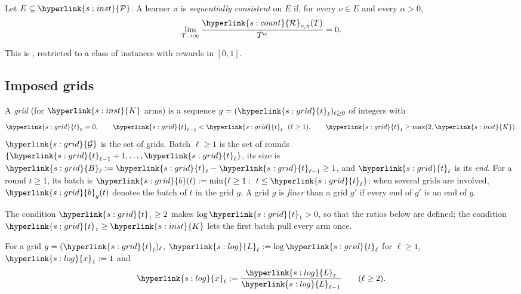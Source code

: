 \documentclass[11pt]{article}
\newcommand{\dt}[1]{\hypertarget{#1}{}}
\newcommand{\sy}[2]{{\hyperlink{#1}{#2}}}
\newcommand{\1}{\mathbf{1}}
\newcommand{\Kar}{\sy{s:inst}{K}}
\newcommand{\cP}{\sy{s:inst}{\mathcal P}}
\newcommand{\Reg}{\sy{s:count}{\mathcal R}}
\newcommand{\Gr}{\sy{s:grid}{\mathcal G}}
\newcommand{\tl}{\sy{s:grid}{t}}
\newcommand{\Bg}{\sy{s:grid}{B}}
\newcommand{\bt}{\sy{s:grid}{b}}
\newcommand{\Lg}{\sy{s:log}{L}}
\newcommand{\xg}{\sy{s:log}{x}}
\begin{document}
\begin{definition}\label{def:seqcons}
\dt{t:seqc}Let $E\subseteq\cP$. A learner $\pi$ is \emph{sequentially consistent} on $E$ if, for
every $\nu\in E$ and every $\alpha>0$,
\begin{equation*}
  \lim_{T\to\infty}\frac{\Reg_{\nu,\pi}(T)}{T^{\alpha}}=0 .
\end{equation*}
\end{definition}

This is \citet[Definition~16.1]{LS}, restricted to a class of instances with rewards in $[0,1]$.

\subsection{Imposed grids}

\begin{definition}\label{def:grid}
\dt{s:grid}A \emph{grid} (for $\Kar$ arms) is a sequence $g=(\tl_\ell)_{\ell\ge0}$ of integers with
\begin{equation*}
  \tl_0=0,\qquad \tl_{\ell-1}<\tl_\ell\ \ (\ell\ge1),\qquad \tl_1\ge\max(2,\Kar).
\end{equation*}
$\Gr$ is the set of grids. Batch $\ell\ge1$ is the set of rounds $\{\tl_{\ell-1}+1,\dots,\tl_\ell\}$,
its size is $\Bg_\ell:=\tl_\ell-\tl_{\ell-1}\ge1$, and $\tl_\ell$ is its \emph{end}. For a round
$t\ge1$, its batch is $\bt(t):=\min\{\ell\ge1:\ t\le\tl_\ell\}$; when several grids are involved,
$\bt_g(t)$ denotes the batch of $t$ in the grid $g$. A grid $g$ is \dt{t:finer}\emph{finer}
than a grid $g'$ if every end of $g'$ is an end of $g$.
\end{definition}

The condition $\tl_1\ge2$ makes $\log\tl_1>0$, so that the ratios below are defined; the condition
$\tl_1\ge\Kar$ lets the first batch pull every arm once.

\begin{definition}\label{def:logratio}
\dt{s:log}For a grid $g=(\tl_\ell)_\ell$, $\Lg_\ell:=\log\tl_\ell$ for $\ell\ge1$, $\xg_1:=1$ and
\begin{equation*}
  \xg_\ell:=\frac{\Lg_\ell}{\Lg_{\ell-1}}\qquad(\ell\ge2).
\end{equation*}
\end{definition}
\end{document}
